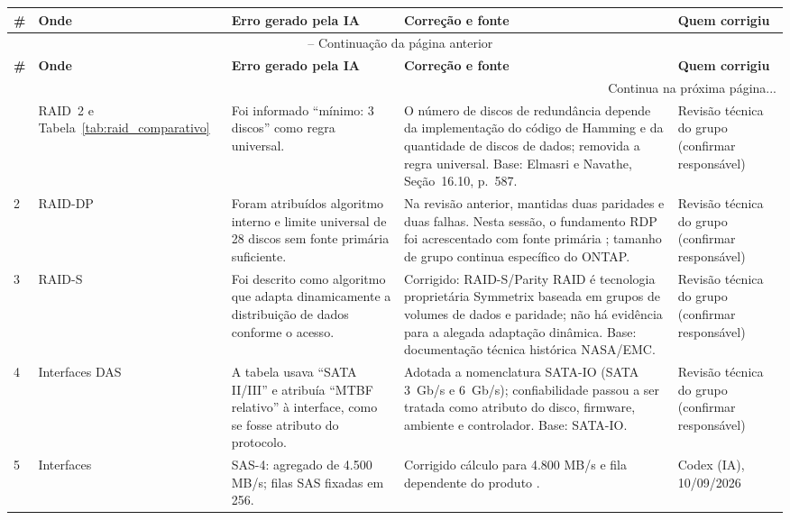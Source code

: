 \documentclass[titlepage]{article}
\begin{document}
\begingroup
\footnotesize
\renewcommand{\arraystretch}{1.5}
\begin{longtable}{|p{}|p{}|p{}|p{}|p{}|}
\hline
\textbf{\#} & \textbf{Onde} & \textbf{Erro gerado pela IA} & \textbf{Correção e fonte} & \textbf{Quem corrigiu} \\
\hline
\endfirsthead
\multicolumn{5}{c}{{\tablename\ \thetable{} -- Continuação da página anterior}} \\
\hline
\textbf{\#} & \textbf{Onde} & \textbf{Erro gerado pela IA} & \textbf{Correção e fonte} & \textbf{Quem corrigiu} \\
\hline
\endhead
\hline \multicolumn{5}{r}{{Continua na próxima página...}} \\
\endfoot
\hline
\endlastfoot
1 & RAID~2 e Tabela~\ref{tab:raid_comparativo} & Foi informado ``mínimo: 3 discos'' como regra universal. & O número de discos de redundância depende da implementação do código de Hamming e da quantidade de discos de dados; removida a regra universal. Base: Elmasri e Navathe, Seção~16.10, p.~587. & Revisão técnica do grupo (confirmar responsável) \\
\hline
2 & RAID-DP & Foram atribuídos algoritmo interno e limite universal de 28 discos sem fonte primária suficiente. & Na revisão anterior, mantidas duas paridades e duas falhas. Nesta sessão, o fundamento RDP foi acrescentado com fonte primária \cite{corbett2004}; tamanho de grupo continua específico do ONTAP. & Revisão técnica do grupo (confirmar responsável) \\
\hline
3 & RAID-S & Foi descrito como algoritmo que adapta dinamicamente a distribuição de dados conforme o acesso. & Corrigido: RAID-S/Parity RAID é tecnologia proprietária Symmetrix baseada em grupos de volumes de dados e paridade; não há evidência para a alegada adaptação dinâmica. Base: documentação técnica histórica NASA/EMC. & Revisão técnica do grupo (confirmar responsável) \\
\hline
4 & Interfaces DAS & A tabela usava ``SATA II/III'' e atribuía ``MTBF relativo'' à interface, como se fosse atributo do protocolo. & Adotada a nomenclatura SATA-IO (SATA 3~Gb/s e 6~Gb/s); confiabilidade passou a ser tratada como atributo do disco, firmware, ambiente e controlador. Base: SATA-IO. & Revisão técnica do grupo (confirmar responsável) \\
\hline
5 & Interfaces & SAS-4: agregado de 4.500 MB/s; filas SAS fixadas em 256. & Corrigido cálculo para 4.800 MB/s e fila dependente do produto \cite{microchip_sas4,seagate_sas}. & Codex (IA), 10/09/2026 \\

\end{longtable}
\end{document}
